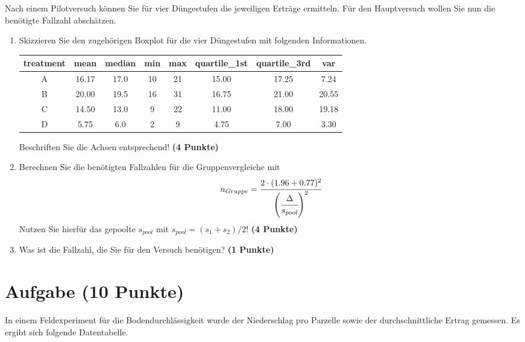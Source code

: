 \documentclass[a4paper, 10pt]{scrartcl}\usepackage[]{graphicx}\usepackage[]{color}
\newenvironment{knitrout}{}{} %
\begin{document}
Nach einem Pilotversuch k{\"o}nnen Sie f{\"u}r vier D{\"u}ngestufen die jeweiligen
Ertr{\"a}ge ermitteln. F{\"u}r den Hauptversuch wollen Sie nun die ben{\"o}tigte
Fallzahl absch{\"a}tzen. 



\begin{enumerate}
\item Skizzieren Sie den zugeh{\"o}rigen Boxplot f{\"u}r die vier D{\"u}ngestufen mit
  folgenden Informationen.
\begin{knitrout}
\color{fgcolor}\begin{table}[!h]
\centering
\begin{tabular}{cccccccc}
\toprule
treatment & mean & median & min & max & quartile\_1st & quartile\_3rd & var\\
\midrule
A & 16.17 & 17.0 & 10 & 21 & 15.00 & 17.25 & 7.24\\
B & 20.00 & 19.5 & 16 & 31 & 16.75 & 21.00 & 20.55\\
C & 14.50 & 13.0 & 9 & 22 & 11.00 & 18.00 & 19.18\\
D & 5.75 & 6.0 & 2 & 9 & 4.75 & 7.00 & 3.30\\
\bottomrule
\end{tabular}
\end{table}

\end{knitrout}
Beschriften Sie die Achsen entsprechend! \textbf{(4 Punkte)}
\item Berechnen Sie die ben{\"o}tigten Fallzahlen f{\"u}r die Gruppenvergleiche mit
\begin{equation*}
  n_{Gruppe} = \cfrac{2 \cdot (1.96 + 0.77)^2}{\left(\cfrac{\Delta}{s_{pool}}\right)^2}
\end{equation*}
Nutzen Sie hierf{\"u}r das gepoolte $s_{pool}$ mit $s_{pool} = (s_1 + s_2)/2$! \textbf{(4 Punkte)}
\item Was ist die Fallzahl, die Sie f{\"u}r den Versuch ben{\"o}tigen? \textbf{(1 Punkte)}
\end{enumerate} 
\clearpage

\section{Aufgabe \hfill (10 Punkte)}

In einem Feldexperiment f{\"u}r die Bodendurchl{\"a}ssigkeit wurde der Niederschlag
pro Parzelle sowie der durchschnittliche Ertrag gemessen. Es ergibt sich
folgende Datentabelle. 
\end{document}

